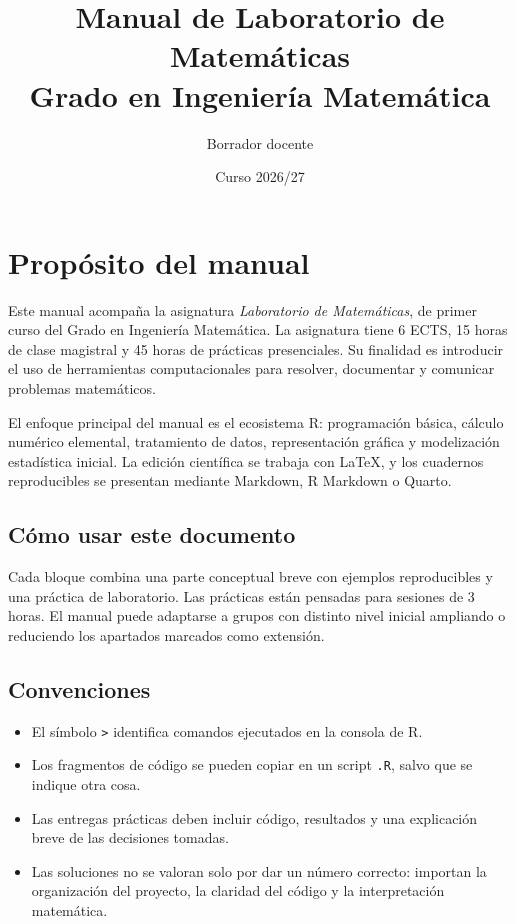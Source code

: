\documentclass[11pt,a4paper,oneside]{book}
\title{\Huge Manual de Laboratorio de Matemáticas\\[0.5em]
\Large Grado en Ingeniería Matemática}
\author{Borrador docente}
\date{Curso 2026/27}
\begin{document}
\frontmatter
\maketitle

\chapter*{Propósito del manual}
Este manual acompaña la asignatura \emph{Laboratorio de Matemáticas}, de primer curso del Grado en Ingeniería Matemática. La asignatura tiene 6 ECTS, 15 horas de clase magistral y 45 horas de prácticas presenciales. Su finalidad es introducir el uso de herramientas computacionales para resolver, documentar y comunicar problemas matemáticos.

El enfoque principal del manual es el ecosistema R: programación básica, cálculo numérico elemental, tratamiento de datos, representación gráfica y modelización estadística inicial. La edición científica se trabaja con LaTeX, y los cuadernos reproducibles se presentan mediante Markdown, R Markdown o Quarto.

\section*{Cómo usar este documento}
Cada bloque combina una parte conceptual breve con ejemplos reproducibles y una práctica de laboratorio. Las prácticas están pensadas para sesiones de 3 horas. El manual puede adaptarse a grupos con distinto nivel inicial ampliando o reduciendo los apartados marcados como extensión.

\section*{Convenciones}
\begin{itemize}
  \item El símbolo \texttt{>} identifica comandos ejecutados en la consola de R.
  \item Los fragmentos de código se pueden copiar en un script \texttt{.R}, salvo que se indique otra cosa.
  \item Las entregas prácticas deben incluir código, resultados y una explicación breve de las decisiones tomadas.
  \item Las soluciones no se valoran solo por dar un número correcto: importan la organización del proyecto, la claridad del código y la interpretación matemática.
\end{itemize}
\end{document}
